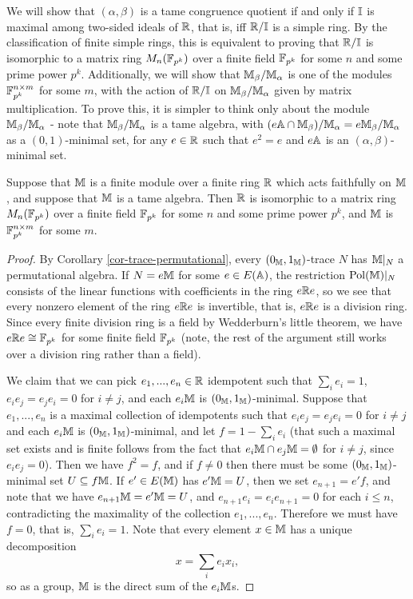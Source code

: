 \begin{appendices}
\begin{ex}
We will show that $(\alpha,\beta)$ is a tame congruence quotient if and only if $\mathbb{I}$ is maximal among two-sided ideals of $\mathbb{R}$, that is, iff $\mathbb{R}/\mathbb{I}$ is a simple ring. By the classification of finite simple rings, this is equivalent to proving that $\mathbb{R}/\mathbb{I}$ is isomorphic to a matrix ring $M_n(\mathbb{F}_{p^k})$ over a finite field $\mathbb{F}_{p^k}$ for some $n$ and some prime power $p^k$. Additionally, we will show that $\mathbb{M}_\beta/\mathbb{M}_\alpha$ is one of the modules $\mathbb{F}_{p^k}^{n\times m}$ for some $m$, with the action of $\mathbb{R}/\mathbb{I}$ on $\mathbb{M}_\beta/\mathbb{M}_\alpha$ given by matrix multiplication. To prove this, it is simpler to think only about the module $\mathbb{M}_\beta/\mathbb{M}_\alpha$ - note that $\mathbb{M}_\beta/\mathbb{M}_\alpha$ is a tame algebra, with $(e\mathbb{A}\cap \mathbb{M}_\beta)/\mathbb{M}_\alpha = e\mathbb{M}_\beta/\mathbb{M}_\alpha$ as a $(0,1)$-minimal set, for any $e \in \mathbb{R}$ such that $e^2 = e$ and $e\mathbb{A}$ is an $(\alpha,\beta)$-minimal set.
\end{ex}

\begin{prop} Suppose that $\mathbb{M}$ is a finite module over a finite ring $\mathbb{R}$ which acts faithfully on $\mathbb{M}$, and suppose that $\mathbb{M}$ is a tame algebra. Then $\mathbb{R}$ is isomorphic to a matrix ring $M_n(\mathbb{F}_{p^k})$ over a finite field $\mathbb{F}_{p^k}$ for some $n$ and some prime power $p^k$, and $\mathbb{M}$ is $\mathbb{F}_{p^k}^{n\times m}$ for some $m$.
\end{prop}
\begin{proof}
By Corollary \ref{cor-trace-permutational}, every $(0_{\mathbb{M}},1_{\mathbb{M}})$-trace $N$ has $\mathbb{M}|_N$ a permutational algebra. If $N = e\mathbb{M}$ for some $e \in E(\mathbb{A})$, the restriction $\operatorname{Pol}(\mathbb{M})|_N$ consists of the linear functions with coefficients in the ring $e\mathbb{R} e$, so we see that every nonzero element of the ring $e\mathbb{R} e$ is invertible, that is, $e\mathbb{R} e$ is a division ring. Since every finite division ring is a field by Wedderburn's little theorem, we have $e \mathbb{R} e \cong \mathbb{F}_{p^k}$ for some finite field $\mathbb{F}_{p^k}$ (note, the rest of the argument still works over a division ring rather than a field).

We claim that we can pick $e_1, ..., e_n \in \mathbb{R}$ idempotent such that $\sum_i e_i = 1$, $e_ie_j = e_je_i = 0$ for $i \ne j$, and each $e_i\mathbb{M}$ is $(0_{\mathbb{M}},1_{\mathbb{M}})$-minimal. Suppose that $e_1, ..., e_n$ is a maximal collection of idempotents such that $e_ie_j = e_je_i = 0$ for $i \ne j$ and each $e_i\mathbb{M}$ is $(0_{\mathbb{M}},1_{\mathbb{M}})$-minimal, and let $f = 1 - \sum_i e_i$ (that such a maximal set exists and is finite follows from the fact that $e_i\mathbb{M} \cap e_j\mathbb{M} = \emptyset$ for $i \ne j$, since $e_ie_j = 0$). Then we have $f^2 = f$, and if $f \ne 0$ then there must be some $(0_{\mathbb{M}},1_{\mathbb{M}})$-minimal set $U \subseteq f\mathbb{M}$. If $e' \in E(\mathbb{M})$ has $e'\mathbb{M} = U$, then we set $e_{n+1} = e'f$, and note that we have $e_{n+1}\mathbb{M} = e'\mathbb{M} = U$, and $e_{n+1}e_i = e_ie_{n+1} = 0$ for each $i \le n$, contradicting the maximality of the collection $e_1, ..., e_n$. Therefore we must have $f = 0$, that is, $\sum_i e_i = 1$. Note that every element $x \in \mathbb{M}$ has a unique decomposition
\[
x = \sum_i e_ix_i,
\]
so as a group, $\mathbb{M}$ is the direct sum of the $e_i\mathbb{M}$s.


\end{proof}
\end{appendices}
